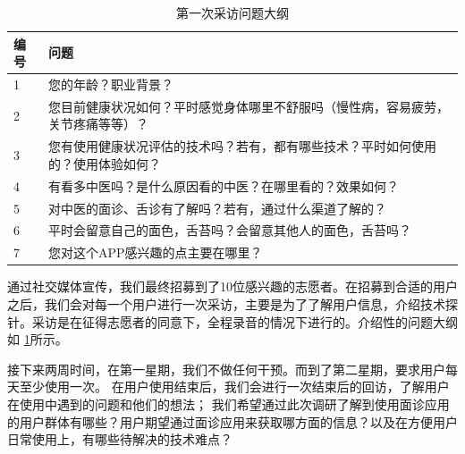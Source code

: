 \begin{table}[h]
    
    
    \begin{tabular}{ll}
        \toprule
        编号 & 问题 \\
        \midrule
        1  & 您的年龄？职业背景？   \\
        2  & 您目前健康状况如何？平时感觉身体哪里不舒服吗（慢性病，容易疲劳，关节疼痛等等）？   \\
        3  &  您有使用健康状况评估的技术吗？若有，都有哪些技术？平时如何使用的？使用体验如何？  \\
        4  & 有看多中医吗？是什么原因看的中医？在哪里看的？效果如何？   \\
        5   & 对中医的面诊、舌诊有了解吗？若有，通过什么渠道了解的？   \\
        6  & 平时会留意自己的面色，舌苔吗？会留意其他人的面色，舌苔吗？\\
        7   & 您对这个APP感兴趣的点主要在哪里？\\
        \bottomrule
    \end{tabular}
    \caption{第一次采访问题大纲}
    \label{tab:inteview_questions}
\end{table}

通过社交媒体宣传，我们最终招募到了10位感兴趣的志愿者。在招募到合适的用户之后，我们会对每一个用户进行一次采访，主要是为了了解用户信息，介绍技术探针。采访是在征得志愿者的同意下，全程录音的情况下进行的。介绍性的问题大纲如 \ref{tab:inteview_questions}所示。


接下来两周时间，在第一星期，我们不做任何干预。而到了第二星期，要求用户每天至少使用一次。
在用户使用结束后，我们会进行一次结束后的回访，了解用户在使用中遇到的问题和他们的想法；
我们希望通过此次调研了解到使用面诊应用的用户群体有哪些？用户期望通过面诊应用来获取哪方面的信息？以及在方便用户日常使用上，有哪些待解决的技术难点？


